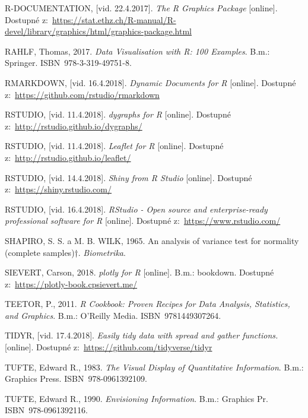 \documentclass[12pt,]{article}
\begin{document}
\hypertarget{ref-graphics}{}
R-DOCUMENTATION, {[}vid. 22.4.2017{]}. \emph{The R Graphics Package}
{[}online{]}. Dostupné
z:~\url{https://stat.ethz.ch/R-manual/R-devel/library/graphics/html/graphics-package.html}

\hypertarget{ref-datavis_rahlf}{}
RAHLF, Thomas, 2017. \emph{Data Visualisation with R: 100 Examples}.
B.m.: Springer. ISBN~978-3-319-49751-8.

\hypertarget{ref-rmarkdown}{}
RMARKDOWN, {[}vid. 16.4.2018{]}. \emph{Dynamic Documents for R}
{[}online{]}. Dostupné z:~\url{https://github.com/rstudio/rmarkdown}

\hypertarget{ref-dygraphs}{}
RSTUDIO, {[}vid. 11.4.2018{]}. \emph{dygraphs for R} {[}online{]}.
Dostupné z:~\url{http://rstudio.github.io/dygraphs/}

\hypertarget{ref-leaflet}{}
RSTUDIO, {[}vid. 11.4.2018{]}. \emph{Leaflet for R} {[}online{]}.
Dostupné z:~\url{http://rstudio.github.io/leaflet/}

\hypertarget{ref-shiny}{}
RSTUDIO, {[}vid. 14.4.2018{]}. \emph{Shiny from R Studio} {[}online{]}.
Dostupné z:~\url{https://shiny.rstudio.com/}

\hypertarget{ref-rstudio}{}
RSTUDIO, {[}vid. 16.4.2018{]}. \emph{RStudio - Open source and
enterprise-ready professional software for R} {[}online{]}. Dostupné
z:~\url{https://www.rstudio.com/}

\hypertarget{ref-SW_test}{}
SHAPIRO, S. S. a M. B. WILK, 1965. An analysis of variance test for
normality (complete samples)†. \emph{Biometrika}.

\hypertarget{ref-plotly}{}
SIEVERT, Carson, 2018. \emph{plotly for R} {[}online{]}. B.m.: bookdown.
Dostupné z:~\url{https://plotly-book.cpsievert.me/}

\hypertarget{ref-teetor2011}{}
TEETOR, P., 2011. \emph{R Cookbook: Proven Recipes for Data Analysis,
Statistics, and Graphics}. B.m.: O'Reilly Media. ISBN~9781449307264.

\hypertarget{ref-tidyr}{}
TIDYR, {[}vid. 17.4.2018{]}. \emph{Easily tidy data with spread and
gather functions.} {[}online{]}. Dostupné
z:~\url{https://github.com/tidyverse/tidyr}

\hypertarget{ref-tufte1983}{}
TUFTE, Edward R., 1983. \emph{The Visual Display of Quantitative
Information}. B.m.: Graphics Press. ISBN~978-0961392109.

\hypertarget{ref-tufte1990}{}
TUFTE, Edward R., 1990. \emph{Envisioning Information}. B.m.: Graphics
Pr. ISBN~978-0961392116.
\end{document}
